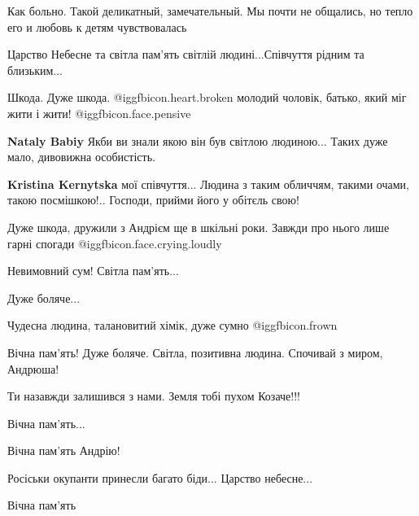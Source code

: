  
 
 
 
 
\zzSecCmt

\begin{itemize} %
Как больно. Такой деликатный, замечательный. Мы почти не общались, но тепло его и любовь к детям чувствовалась

Царство Небесне та світла пам'ять світлій людині...Співчуття рідним та близьким...

Шкода. Дуже шкода.  @igg{fbicon.heart.broken}  молодий чоловік, батько, який міг жити і жити!  @igg{fbicon.face.pensive} 

\textbf{Nataly Babiy} Якби ви знали якою він був світлою людиною... Таких дуже мало, дивовижна особистість.

\textbf{Kristina Kernytska} мої співчуття... Людина з таким обличчям, такими очами, такою посмішкою!.. Господи, прийми його у обітєль свою!

Дуже шкода, дружили з Андрієм ще в шкільні роки. Завжди про нього лише гарні спогади @igg{fbicon.face.crying.loudly} 

Невимовний сум! Світла пам'ять...

Дуже боляче...

Чудесна людина, талановитий хімік, дуже сумно  @igg{fbicon.frown} 

Вічна пам'ять! Дуже боляче. Світла, позитивна людина. Спочивай з миром, Андрюша!

Ти назавжди залишився з нами. Земля тобі пухом Козаче!!!

Вічна пам'ять...

Вічна пам'ять Андрію!


Росіськи окупанти принесли багато біди...
Царство небесне...

Вічна пам'ять


\end{itemize}
